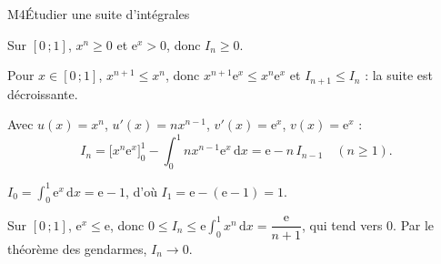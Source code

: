 \begin{fichemethode}{M4}{Étudier une suite d'intégrales}
{  \medskip
  Sur $[0\,;1]$, $x^n \geq 0$ et $\mathrm{e}^x > 0$, donc $I_n \geq 0$.

  Pour $x \in [0\,;1]$, $x^{n+1} \leq x^n$, donc
  $x^{n+1}\mathrm{e}^x \leq x^n\mathrm{e}^x$ et $I_{n+1} \leq I_n$ : la suite
  est décroissante.

  Avec $u(x)=x^n$, $u'(x)=nx^{n-1}$, $v'(x)=\mathrm{e}^x$, $v(x)=\mathrm{e}^x$ :
  \[
    I_n = \big[x^n\mathrm{e}^x\big]_0^1 - \int_0^1 nx^{n-1}\mathrm{e}^x
    \,\mathrm{d}x = \mathrm{e} - n\,I_{n-1} \quad (n \geq 1).
  \]

  $I_0 = \displaystyle\int_0^1 \mathrm{e}^x\,\mathrm{d}x = \mathrm{e}-1$, d'où
  $I_1 = \mathrm{e} - (\mathrm{e}-1) = 1$.

  Sur $[0\,;1]$, $\mathrm{e}^x \leq \mathrm{e}$, donc
  $0 \leq I_n \leq \mathrm{e}\displaystyle\int_0^1 x^n\,\mathrm{d}x
  = \dfrac{\mathrm{e}}{n+1}$, qui tend vers $0$. Par le théorème des
  gendarmes, $I_n \to 0$.
}


\end{fichemethode}
